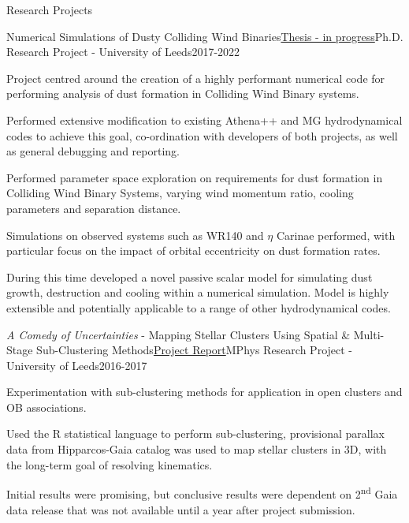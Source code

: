 \documentclass{resume} %
\begin{document}
\begin{rSection}{Research Projects}

\begin{rSubsection}{Numerical Simulations of Dusty Colliding Wind Binaries}{\href{https://raw.githubusercontent.com/atomsite/Thesis/master/Thesis.pdf}{Thesis - in progress}}{Ph.D. Research Project - University of Leeds}{2017-2022}
\item Project centred around the creation of a highly performant numerical code for performing analysis of dust formation in Colliding Wind Binary systems.
\item Performed extensive modification to existing Athena++ and MG hydrodynamical codes to achieve this goal, co-ordination with developers of both projects, as well as general debugging and reporting.
\item Performed parameter space exploration on requirements for dust formation in Colliding Wind Binary Systems, varying wind momentum ratio, cooling parameters and separation distance.
\item Simulations on observed systems such as WR140 and $\eta$ Carinae performed, with particular focus on the impact of orbital eccentricity on dust formation rates.
\item During this time developed a novel passive scalar model for simulating dust growth, destruction and cooling within a numerical simulation. Model is highly extensible and potentially applicable to a range of other hydrodynamical codes.
\end{rSubsection}

\begin{rSubsection}{\textit{A Comedy of Uncertainties} - Mapping Stellar Clusters Using Spatial \& Multi-Stage Sub-Clustering Methods}{\href{https://raw.githubusercontent.com/atomsite/masters-project/main/masters-report.pdf}{Project Report}}{MPhys Research Project - University of Leeds}{2016-2017}
\item Experimentation with sub-clustering methods for application in open clusters and OB associations.
\item Used the R statistical language to perform sub-clustering, provisional parallax data from Hipparcos-Gaia catalog was used to map stellar clusters in 3D, with the long-term goal of resolving kinematics.
\item Initial results were promising, but conclusive results were dependent on 2\textsuperscript{nd} Gaia data release that was not available until a year after project submission.
\end{rSubsection}

\end{rSection}
\end{document}
